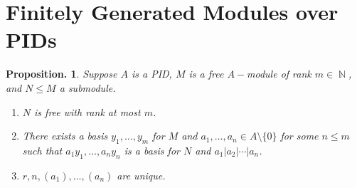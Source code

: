 \documentclass[11pt, a4paper]{memoir}
\DeclareMathOperator{\N}{{\mathbb{N}}}
\theoremstyle{change}
\newtheorem{proposition}[theorem]{Proposition.}
\theoremstyle{plain}
\theoremstyle{nonumberplain}
\numberwithin{equation}{section}
\begin{document}
\section{Finitely Generated Modules over PIDs}
\begin{proposition}\label{ftpid-prop}
    Suppose $A$ is a PID, $M$ is a free $A-$module of rank $m\in\N$, and $N\leq M$ a submodule.
    \begin{enumerate}[nolistsep,label=(\roman*)]
        \item $N$ is free with rank at most $m$.
        \item There exists a basis $y_1,\ldots,y_m$ for $M$ and $a_1,\ldots,a_n\in A\setminus\{0\}$ for some $n\leq m$ such that $a_1y_1,\ldots,a_ny_n$ is a basis for $N$ and $a_1|a_2|\cdots|a_n$.
        \item $r,n,(a_1),\ldots,(a_n)$ are unique.
    \end{enumerate}
\end{proposition}
\end{document}
